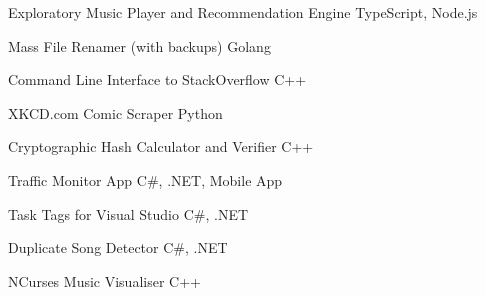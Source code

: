
\begin{projentries}

\projentry%
  {Exploratory Music Player and Recommendation Engine} %
  {TypeScript, Node.js} %
  {} %
  {}

\projentry%
  {Mass File Renamer (with backups)} %
  {Golang} %
  {} %
  {}

\projentry%
  {Command Line Interface to StackOverflow} %
  {C++} %
  {} %
  {}

\projentry%
  {XKCD.com Comic Scraper} %
  {Python} %
  {} %
  {}

\projentry%
  {Cryptographic Hash Calculator and Verifier} %
  {C++} %
  {} %
  {}

\projentry%
  {Traffic Monitor App} %
  {C\#, .NET, Mobile App} %
  {} %
  {}

\projentry%
  {Task Tags for Visual Studio} %
  {C\#, .NET} %
  {} %
  {}

\projentry%
  {Duplicate Song Detector} %
  {C\#, .NET} %
  {} %
  {}


\projentry%
  {NCurses Music Visualiser} %
  {C++} %
  {} %
  {}


\end{projentries}
